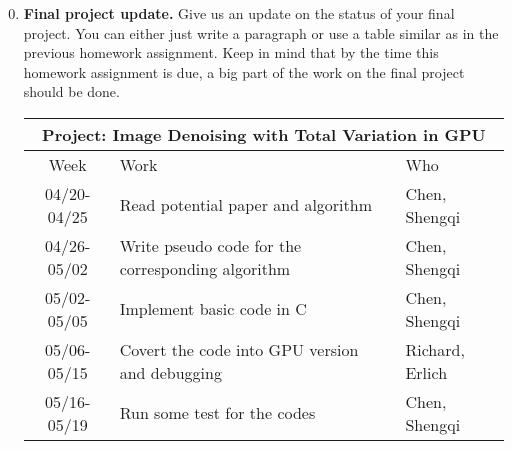 \documentclass[12pt]{article}
\begin{document}
\begin{enumerate}
\setcounter{enumi}{-1}

  
\item {\bf Final project update.} Give us an update on the status of
  your final project. You can either just write a paragraph or use a
  table similar as in the previous homework assignment. Keep in mind that
  by the time this homework assignment is due, a big part of the work on the final
  project should be done.
  
  \begin{center}
  \begin{tabular} {|c|p{9cm}|p{2cm}|}
    \hline
    \multicolumn{3}{|c|}{\bf Project: Image Denoising with Total Variation in GPU} \\
    \hline
    Week & Work & Who  \\ \hline \hline
    04/20-04/25 & Read potential paper and algorithm & Chen, Shengqi \\ \hline
    04/26-05/02 & Write pseudo code for the corresponding algorithm  & Chen, Shengqi \\ \hline
    05/02-05/05 &  Implement basic code in C & Chen, Shengqi\\ \hline
    05/06-05/15 & Covert the code into GPU version and debugging & Richard, Erlich \\ \hline
    05/16-05/19 & Run some test for the codes  & Chen, Shengqi \\ \hline
  \end{tabular}
  \end{center}


\end{enumerate}
\end{document}
